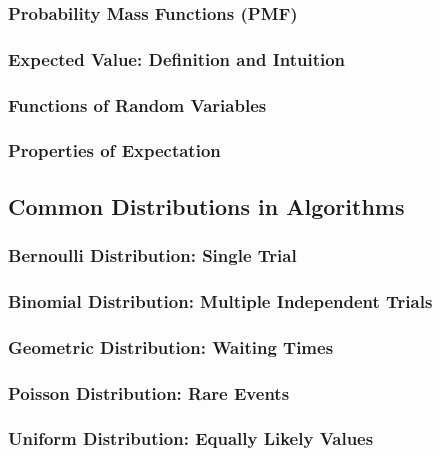 \subsubsection{Probability Mass Functions (PMF)}

\subsubsection{Expected Value: Definition and Intuition}

\subsubsection{Functions of Random Variables}

\subsubsection{Properties of Expectation}

\subsection{Common Distributions in Algorithms}
\label{subsec:distributions}

\subsubsection{Bernoulli Distribution: Single Trial}

\subsubsection{Binomial Distribution: Multiple Independent Trials}

\subsubsection{Geometric Distribution: Waiting Times}

\subsubsection{Poisson Distribution: Rare Events}

\subsubsection{Uniform Distribution: Equally Likely Values}

